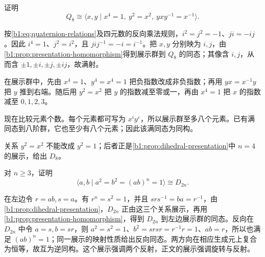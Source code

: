 \begin{exercise}\label{b1:ex:08-quaternion-presentation}
	证明
	\[
		Q_8\cong\langle x,y\mid x^4=1,\ y^2=x^2,\ yxy^{-1}=x^{-1}\rangle.
	\]
\end{exercise}
\begin{solution}
	按\eqref{b1:eq:quaternion-relations}及四元数的反向乘法规则，\(i^2=j^2=-1\)、\(ji=-ij\)。因此 \(i^4=1\)、\(j^2=i^2\)，且 \(jij^{-1}=-i=i^{-1}\)。把 \(x,y\) 分别映为 \(i,j\)，由\cref{b1:prop:presentation-homomorphism}得到展示群到 \(Q_8\) 的同态；其像含 \(i,j\)，从而含 \(\pm1,\pm i,\pm j,\pm ij\)，故满射。

	在展示群中，先由 \(x^4=1\)、\(y^4=x^4=1\) 把负指数改成非负指数；再用 \(yx=x^{-1}y\) 把 \(y\) 推到右端。随后用 \(y^2=x^2\) 把 \(y\) 的指数减至零或一，再由 \(x^4=1\) 把 \(x\) 的指数减至 \(0,1,2,3\)。

	现在比较元素个数。每个元素都可写为 \(x^iy^\varepsilon\)，所以展示群至多八个元素。已有满同态到八阶群，它也至少有八个元素；因此该满同态为同构。

	关系 \(y^2=x^2\) 不能改成 \(y^2=1\)；后者正是\cref{b1:prop:dihedral-presentation}中 \(n=4\) 的展示，给出 \(D_8\)。
\end{solution}

\begin{exercise}\label{b1:ex:08-two-reflection-presentation}
	对 \(n\ge3\)，证明
	\[
		\bigl\langle a,b\mid a^2=b^2=(ab)^n=1\bigr\rangle\cong D_{2n}.
	\]
\end{exercise}
\begin{solution}
	在左边令 \(r=ab,s=a\)。有 \(r^n=s^2=1\)，并且 \(srs^{-1}=ba=r^{-1}\)，由\cref{b1:prop:dihedral-presentation}，\(D_{2n}\) 正由这三个关系展示，再用\cref{b1:prop:presentation-homomorphism}，得到 \(D_{2n}\) 到左边展示群的同态。反向在 \(D_{2n}\) 中令 \(a=s,b=sr\)，则 \(a^2=s^2=1\)、\(b^2=srsr=r^{-1}r=1\)、\(ab=r\)，所以也满足 \((ab)^n=1\)；同一展示的映射性质给出反向同态。两方向在相应生成元上复合为恒等，故互为逆同构。这个展示强调两个反射，正文的展示强调旋转与反射。
\end{solution}

